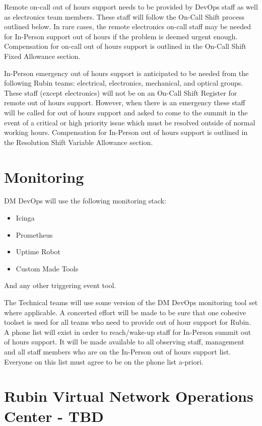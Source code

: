 Remote on-call out of hours support needs to be provided by DevOps staff as well as electronics team members.  These staff will follow the On-Call Shift process outlined below.  In rare cases, the remote electronics on-call staff may be needed for In-Person support out of hours if the problem is deemed urgent enough.  Compensation for on-call out of hours support is outlined in the On-Call Shift Fixed Allowance section.

In-Person emergency out of hours support is anticipated to be needed from the following Rubin teams:  electrical, electronics, mechanical, and optical groups.  These staff (except electronics) will not be on an On-Call Shift Register for remote out of hours support.  However, when there is an emergency these staff will be called for out of hours support and asked to come to the summit in the event of a critical or high priority issue which must be resolved outside of normal working hours.  Compensation for In-Person out of hours support is outlined in the Resolution Shift Variable Allowance section.

\section{Monitoring}

DM DevOps will use the following monitoring stack:

\begin{itemize}
    \item Icinga
    \item Prometheus
    \item Uptime Robot
    \item Custom Made Tools
\end{itemize}

And any other triggering event tool.

The Technical teams will use some version of the DM DevOps monitoring tool set where applicable.
A concerted effort will be made to be sure that one cohesive toolset is used for all teams who need to provide out of hour support for Rubin.
A phone list will exist in order to reach/wake-up staff for In-Person summit out of hours support.  It will be made available to all observing staff, management and all staff members who are on the In-Person out of hours support list.  Everyone on this list must agree to be on the phone list a-priori.

\section{Rubin Virtual Network Operations Center - TBD}


